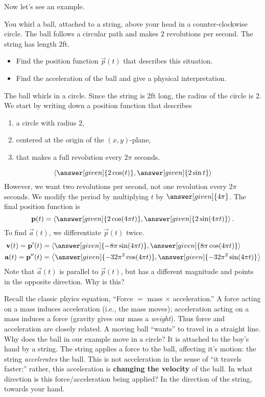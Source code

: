 \documentclass{ximera}
\begin{document}
Now let's see an example.
\begin{example}
You whirl a ball, attached to a string, above your head in a
counter-clockwise circle. The ball follows a circular path and makes
$2$ revolutions per second. The string has length $2$ft.
\begin{itemize}
\item Find the position function $\vec{p}(t)$ that describes this
  situation.
\item Find the acceleration of the ball and give a physical
  interpretation.
\end{itemize}
\begin{explanation}
  The ball whirls in a circle. Since the string is $2$ft long, the
  radius of the circle is $2$. We start by writing down a position
  function that describes
  \begin{enumerate}
  \item a circle with radius $2$,
  \item centered at the origin of the $(x,y)$-plane,
  \item that makes a full revolution every $2\pi$ seconds.
  \end{enumerate}
  \[
  \vector{\answer[given]{2\cos(t)}, \answer[given]{2\sin t}}
  \]
  However, we want two revolutions per second, not one revolution
  every $2\pi$ seconds. We modify the period by multiplying $t$ by
  $\answer[given]{4\pi}$. The final position function is
  \[
  \vec{p}(t) =\vector{\answer[given]{2\cos (4\pi t)},
    \answer[given]{2\sin (4\pi t)}}.
  \] 
  To find $\vec{a}(t)$, we differentiate $\vec{p}(t)$ twice.
  \begin{align*}
    \vec{v}(t) = \vec{p}'(t) &= \vector{\answer[given]{-8\pi \sin (4\pi t)}, \answer[given]{8\pi \cos (4\pi t)}}\\
    \vec{a}(t) =\vec{p}''(t) &= \vector{\answer[given]{-32\pi^2 \cos (4\pi t)}, \answer[given]{-32\pi^2 \sin (4\pi t) }}
  \end{align*}
  Note that $\vec{a}(t)$ is parallel to $\vec{p}(t)$, but has a
  different magnitude and points in the opposite direction. Why is
  this?
  
  Recall the classic phyics equation, ``Force $=$ mass $\times$
  acceleration.'' A force acting on a mass induces acceleration (i.e.,
  the mass moves); acceleration acting on a mass induces a force
  (gravity gives our mass a \emph{weight}). Thus force and
  acceleration are closely related. A moving ball ``wants'' to travel
  in a straight line. Why does the ball in our example move in a
  circle? It is attached to the boy's hand by a string. The string
  applies a force to the ball, affecting it's motion: the string
  \emph{accelerates} the ball. This is not acceleration in the sense
  of ``it travels faster;'' rather, this acceleration is
  \textbf{changing the velocity} of the ball. In what direction is
  this force/acceleration being applied? In the direction of the
  string, towards your hand.
  

\end{explanation}
\end{example}
\end{document}
